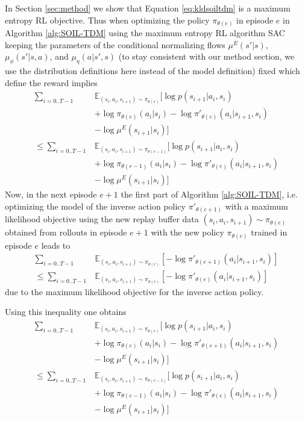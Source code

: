 \documentclass{article}
\begin{document}
In Section \ref{sec:method} we show that Equation \ref{eq:kldsoiltdm} is a maximum entropy RL objective. Thus when optimizing the policy $\pi_{\theta(e)}$ in episode $e$ in Algorithm \ref{alg:SOIL-TDM} using the maximum entropy RL algorithm SAC \cite{haarnoja2018SAC} keeping the parameters of the conditional normalizing flows $\mu^E(s'|s)$, $\mu_{\phi}(s'|s, a)$, and $\mu_{\eta}(a|s', s)$ (to stay consistent with our method section, we use the distribution definitions here instead of the model definition) fixed which define the reward implies
\begin{equation}\label{eq:ineq1}
\begin{aligned}
\sum_{i = 0..T-1} & \mathbb{E}_{(s_i,a_i,s_{i+1}) \sim {\pi_{\theta(e)}}}[\log p(s_{i+1}|a_i,s_i) \\ & + \log \pi_{\theta(e)}(a_i|s_i) - \log \pi'_{\theta(e)}(a_{i}|s_{i+1},s_i) \\ & - \log  \mu^{E}(s_{i+1}|s_i)] \\
\leq \sum_{i = 0..T-1} & \mathbb{E}_{(s_i,a_i,s_{i+1}) \sim {\pi_{\theta(e-1)}}}[\log p(s_{i+1}|a_i,s_i) \\ & + \log \pi_{\theta(e-1)}(a_i|s_i) - \log \pi'_{\theta(e)}(a_{i}|s_{i+1},s_i) \\ & - \log  \mu^{E}(s_{i+1}|s_i)]
\end{aligned}
\end{equation}
Now, in the next episode $e+1$ the first part of Algorithm \ref{alg:SOIL-TDM}, i.e. optimizing the model of the inverse action policy $\pi'_{\theta(e+1)}$ with a maximum likelihood objective using the new replay buffer data $(s_i,a_i,s_{i+1}) \sim {\pi_{\theta(e)}}$ obtained from rollouts in episode $e+1$ with the new policy $\pi_{\theta(e)}$ trained in episode $e$  leads to
\begin{equation}\label{eq:ineq2}
\begin{aligned}
\sum_{i = 0..T-1} & \mathbb{E}_{(s_i,a_i,s_{i+1}) \sim {\pi_{\theta(e)}}}[ - \log \pi'_{\theta(e+1)}(a_{i}|s_{i+1},s_i) ] \\
\leq \sum_{i = 0..T-1} & \mathbb{E}_{(s_i,a_i,s_{i+1}) \sim {\pi_{\theta(e)}}}[ - \log \pi'_{\theta(e)}(a_{i}|s_{i+1},s_i) ]
\end{aligned}
\end{equation}
due to the maximum likelihood objective for the inverse action policy.

Using this inequality one obtains
\begin{equation}\label{eq:ineq3}
\begin{aligned}
\sum_{i = 0..T-1} & \mathbb{E}_{(s_i,a_i,s_{i+1}) \sim {\pi_{\theta(e)}}}[\log p(s_{i+1}|a_i,s_i) \\ & + \log \pi_{\theta(e)}(a_i|s_i) - \log \pi'_{\theta(e+1)}(a_{i}|s_{i+1},s_i) \\ & - \log  \mu^{E}(s_{i+1}|s_i)]
\\
\leq
\sum_{i = 0..T-1} & \mathbb{E}_{(s_i,a_i,s_{i+1}) \sim {\pi_{\theta(e-1)}}}[\log p(s_{i+1}|a_i,s_i) 
\\ & + \log \pi_{\theta(e-1)}(a_i|s_i) - \log \pi'_{\theta(e)}(a_{i}|s_{i+1},s_i)  
\\ & - \log  \mu^{E}(s_{i+1}|s_i)]
\end{aligned}
\end{equation}
\end{document}
